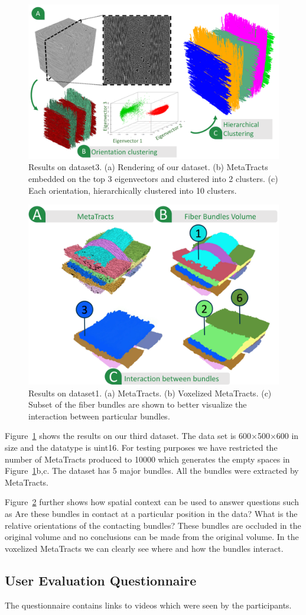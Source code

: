 \begin{figure}[h]
	\centering
	\includegraphics[width=0.7\linewidth]{images_pvis/dataset3.pdf}
	\caption{Results on dataset3. (a) Rendering of our dataset. (b) MetaTracts embedded on the top 3 eigenvectors and clustered into 2 clusters. (c) Each orientation, hierarchically clustered into 10 clusters.}
	\label{fig:dataset3}
\end{figure}
\begin{figure}[h]
	\centering
	\includegraphics[width=0.7\linewidth]{images_pvis/dataset1-extended.pdf}
	\caption{Results on dataset1. (a) MetaTracts. (b) Voxelized MetaTracts. (c) Subset of the fiber bundles are shown to better visualize the interaction between particular bundles.}
	\label{fig:dataset1-extended}
\end{figure}
Figure~\ref{fig:dataset3} shows the results on our third dataset. The data set is 600$\times$500$\times$600 in size and the datatype is uint16. For testing purposes we have restricted the number of MetaTracts produced to 10000 which generates the empty spaces in Figure~\ref{fig:dataset3}b,c.
The dataset has 5 major bundles. All the bundles were extracted by MetaTracts.

Figure~\ref{fig:dataset1-extended} further shows how spatial context can be used to answer questions such as  Are these bundles in contact at a particular position in the data? What is the relative orientations of the contacting bundles? These bundles are occluded in the original volume and no conclusions can be made from the original volume. In the voxelized MetaTracts we can clearly see where and how the bundles interact.






\subsection{User Evaluation Questionnaire}
The questionnaire contains links to videos which were seen by the participants.
\label{subsec:usereval}
\pagebreak

